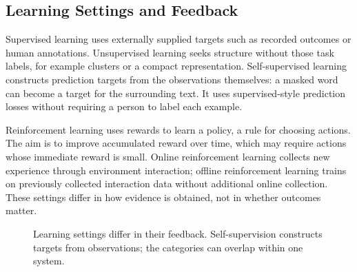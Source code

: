 \subsection{Learning Settings and Feedback}

Supervised learning uses externally supplied targets such as recorded outcomes or human annotations. Unsupervised learning seeks structure without those task labels, for example clusters or a compact representation. Self-supervised learning constructs prediction targets from the observations themselves: a masked word can become a target for the surrounding text. It uses supervised-style prediction losses without requiring a person to label each example.

Reinforcement learning uses rewards to learn a policy, a rule for choosing actions. The aim is to improve accumulated reward over time, which may require actions whose immediate reward is small. Online reinforcement learning collects new experience through environment interaction; offline reinforcement learning trains on previously collected interaction data without additional online collection. These settings differ in how evidence is obtained, not in whether outcomes matter.

\begin{figure}[t]
\centering
{}
\caption{Learning settings differ in their feedback. Self-supervision constructs targets from observations; the categories can overlap within one system.}
\label{fig:feedback-spectrum}
\end{figure}

